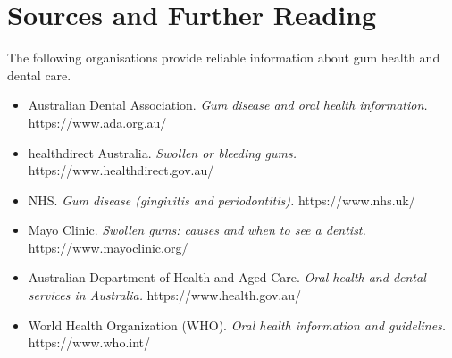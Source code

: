 \section*{Sources and Further Reading}
The following organisations provide reliable information about gum health and dental care.

\begin{itemize}
    \item Australian Dental Association. \textit{Gum disease and oral health information.} https://www.ada.org.au/
    \item healthdirect Australia. \textit{Swollen or bleeding gums.} https://www.healthdirect.gov.au/
    \item NHS. \textit{Gum disease (gingivitis and periodontitis).} https://www.nhs.uk/
    \item Mayo Clinic. \textit{Swollen gums: causes and when to see a dentist.} https://www.mayoclinic.org/
    \item Australian Department of Health and Aged Care. \textit{Oral health and dental services in Australia.} https://www.health.gov.au/
    \item World Health Organization (WHO). \textit{Oral health information and guidelines.} https://www.who.int/
\end{itemize}

\clearpage
